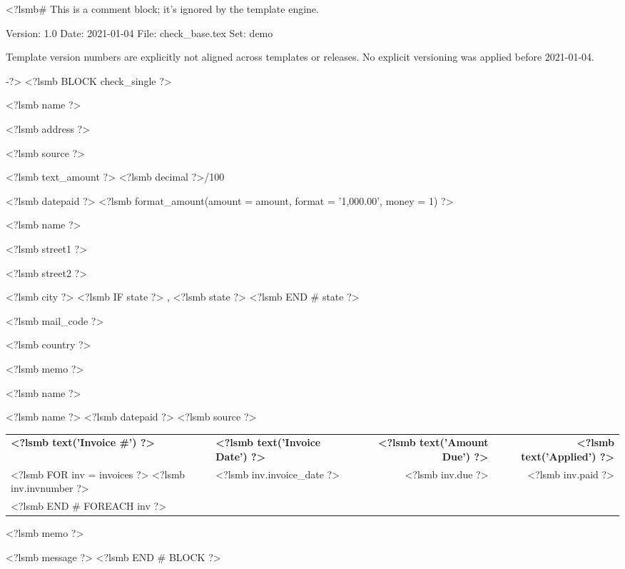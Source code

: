<?lsmb#   This is a comment block; it's ignored by the template engine.

   Version:  1.0
   Date:     2021-01-04
   File:     check_base.tex
   Set:      demo

Template version numbers are explicitly not aligned across templates or
releases. No explicit versioning was applied before 2021-01-04.

-?>
<?lsmb BLOCK check_single ?>
\parbox[t]{12cm}{
  <?lsmb name ?>

  <?lsmb address ?>}
\hfill
\parbox[t]{6cm}{\hfill <?lsmb source ?>}

\vspace*{0.6cm}

<?lsmb text_amount ?> \dotfill <?lsmb decimal ?>/100 \makebox[0.5cm]{\hfill}

\vspace{0.5cm}

\hfill <?lsmb datepaid ?> \makebox[2cm]{\hfill} <?lsmb 
format_amount({amount = amount, format = '1,000.00', money = 1}) ?>


\vspace{0.5cm}

<?lsmb name ?>

<?lsmb street1 ?>

<?lsmb street2 ?>

<?lsmb city ?>
<?lsmb IF state ?>
\hspace{-0.1cm}, <?lsmb state ?>
<?lsmb END # state ?>

<?lsmb mail_code ?>

<?lsmb country ?>

\vspace{1.8cm}

<?lsmb memo ?>

\vspace{0.8cm}

<?lsmb name ?>

\vspace{0.5cm}

<?lsmb name ?> \hfill <?lsmb datepaid ?> \hfill <?lsmb source ?>

\vspace{0.5cm}
\begin{tabularx}{\textwidth}{lXrr@{}}
\textbf{<?lsmb text('Invoice #') ?>} & \textbf{<?lsmb text('Invoice Date') ?>}
  & \textbf{<?lsmb text('Amount Due') ?>} & \textbf{<?lsmb text('Applied') ?>} \\
<?lsmb FOR inv = invoices ?>
<?lsmb inv.invnumber ?> & <?lsmb inv.invoice_date ?> \dotfill
  & <?lsmb inv.due ?> & <?lsmb inv.paid ?> \\
<?lsmb END # FOREACH inv ?>
\end{tabularx}

\vspace{1cm}

<?lsmb memo ?>

\vfill
<?lsmb message ?>
<?lsmb END # BLOCK ?>
